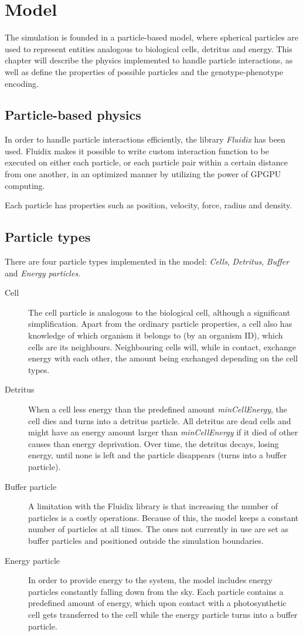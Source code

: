 \chapter{Model}
The simulation is founded in a particle-based model, where spherical particles are used to represent entities analogous to biological cells, detritus and energy. This chapter will describe the physics implemented to handle particle interactions, as well as define the properties of possible particles and the genotype-phenotype encoding.
\section{Particle-based physics}
In order to handle particle interactions efficiently, the library \emph{Fluidix} \citep{fluidix} has been used. Fluidix makes it possible to write custom interaction function to be executed on either each particle, or each particle pair within a certain distance from one another, in an optimized manner by utilizing the power of GPGPU computing.

Each particle has properties such as position, velocity, force, radius and density.

\section{Particle types}
There are four particle types implemented in the model: \emph{Cells}, \emph{Detritus}, \emph{Buffer} and \emph{Energy particles}.
\begin{description}
    \item [Cell] The cell particle is analogous to the biological cell, although a significant simplification. Apart from the ordinary particle properties, a cell also has knowledge of which organism it belongs to (by an organism ID), which cells are its neighbours. Neighbouring cells will, while in contact, exchange energy with each other, the amount being exchanged depending on the cell types.
    \item [Detritus] When a cell less energy than the predefined amount \emph{minCellEnergy}, the cell dies and turns into a detritus particle. All detritus are dead cells and might have an energy amount larger than \emph{minCellEnergy} if it died of other causes than energy deprivation. Over time, the detritus decays, losing energy, until none is left and the particle disappears (turns into a buffer particle).
    \item [Buffer particle] A limitation with the Fluidix library is that increasing the number of particles is a costly operations. Because of this, the model keeps a constant number of particles at all times. The ones not currently in use are set as buffer particles and positioned outside the simulation boundaries. 
    \item [Energy particle] In order to provide energy to the system, the model includes energy particles constantly falling down from the sky. Each particle contains a predefined amount of energy, which upon contact with a photosynthetic cell gets transferred to the cell while the energy particle turns into a buffer particle.
\end{description}


